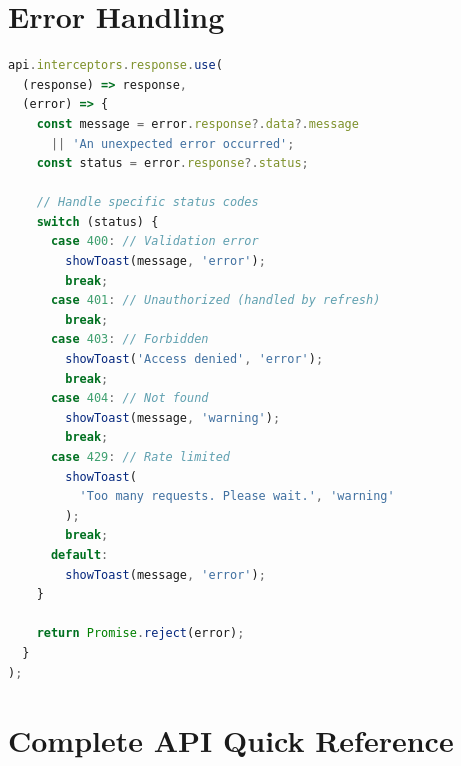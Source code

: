 \section{Error Handling}

\begin{lstlisting}[language=JavaScript,title=Global Error Handler]
api.interceptors.response.use(
  (response) => response,
  (error) => {
    const message = error.response?.data?.message
      || 'An unexpected error occurred';
    const status = error.response?.status;

    // Handle specific status codes
    switch (status) {
      case 400: // Validation error
        showToast(message, 'error');
        break;
      case 401: // Unauthorized (handled by refresh)
        break;
      case 403: // Forbidden
        showToast('Access denied', 'error');
        break;
      case 404: // Not found
        showToast(message, 'warning');
        break;
      case 429: // Rate limited
        showToast(
          'Too many requests. Please wait.', 'warning'
        );
        break;
      default:
        showToast(message, 'error');
    }

    return Promise.reject(error);
  }
);
\end{lstlisting}

\section{Complete API Quick Reference}

